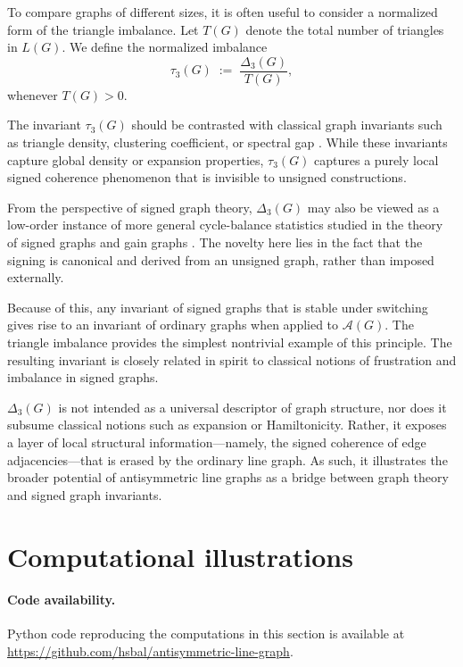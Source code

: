 \documentclass[11pt]{article}
\theoremstyle{plain}
\begin{document}
To compare graphs of different sizes, it is often useful to consider a normalized
form of the triangle imbalance.
Let $T(G)$ denote the total number of triangles in $L(G)$.
We define the normalized imbalance
\[
\tau_3(G) \;:=\; \frac{\Delta_3(G)}{T(G)},
\]
whenever $T(G)>0$.

The invariant $\tau_3(G)$ should be contrasted with classical graph invariants
such as triangle density, clustering coefficient, or spectral gap
\cite{Chung1997,West2001}. 
While these invariants capture global density or expansion properties,
$\tau_3(G)$ captures a purely local signed coherence phenomenon that is invisible
to unsigned constructions.

From the perspective of signed graph theory, $\Delta_3(G)$ may also be viewed as
a low-order instance of more general cycle-balance statistics studied in the
theory of signed graphs and gain graphs \cite{Zaslavsky1982,Zaslavsky1998}.
The novelty here lies in the fact that the signing is canonical and derived from
an unsigned graph, rather than imposed externally.

Because of this, any invariant of signed graphs that is stable under switching gives rise to an invariant of ordinary graphs when applied to $\mathcal{A}(G)$.
The triangle imbalance provides the simplest nontrivial example of this
principle. The resulting invariant is closely related in spirit to classical notions of frustration and imbalance in signed graphs.

$\Delta_3(G)$ is not intended as a universal descriptor of graph
structure, nor does it subsume classical notions such as expansion or
Hamiltonicity.
Rather, it exposes a layer of local structural information—namely, the signed
coherence of edge adjacencies—that is erased by the ordinary line graph.
As such, it illustrates the broader potential of antisymmetric line graphs as a
bridge between graph theory and signed graph invariants.

\section{Computational illustrations}
\label{sec:empirical}

\paragraph{Code availability.}
Python code reproducing the computations in this section is available at
\url{https://github.com/hsbal/antisymmetric-line-graph}.
\end{document}
